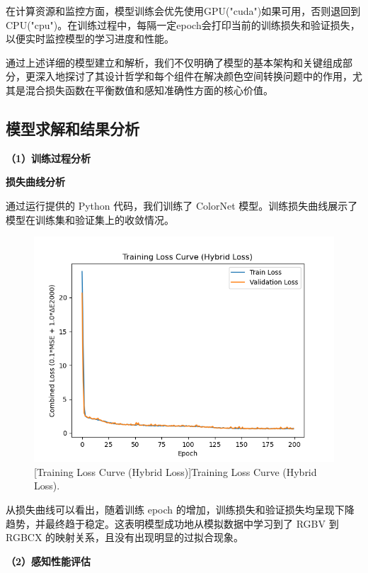 在计算资源和监控方面，模型训练会优先使用GPU("cuda")如果可用，否则退回到CPU("cpu")。在训练过程中，每隔一定epoch会打印当前的训练损失和验证损失，以便实时监控模型的学习进度和性能。

通过上述详细的模型建立和解析，我们不仅明确了模型的基本架构和关键组成部分，更深入地探讨了其设计哲学和每个组件在解决颜色空间转换问题中的作用，尤其是混合损失函数在平衡数值和感知准确性方面的核心价值。

\subsection[\hspace{-2pt}模型求解和结果分析]{{\heiti{} \hspace{-8pt}模型求解和结果分析}}\label{section2: 模型求解和结果分析}

\noindent\textbf{（1）训练过程分析}

 \textbf{损失曲线分析}

通过运行提供的 Python 代码，我们训练了 ColorNet 模型。训练损失曲线展示了模型在训练集和验证集上的收敛情况。

\begin{figure}[H]
\centering
{}
\includegraphics[width=0.8\columnwidth]{figures/Training_Loss_Curve.png}
[Training Loss Curve (Hybrid Loss)]{Training Loss Curve (Hybrid Loss).}
\label{figure2: loss_curve}
\end{figure}

从损失曲线可以看出，随着训练 epoch 的增加，训练损失和验证损失均呈现下降趋势，并最终趋于稳定。这表明模型成功地从模拟数据中学习到了 RGBV 到 RGBCX 的映射关系，且没有出现明显的过拟合现象。

\noindent\textbf{（2）感知性能评估}

